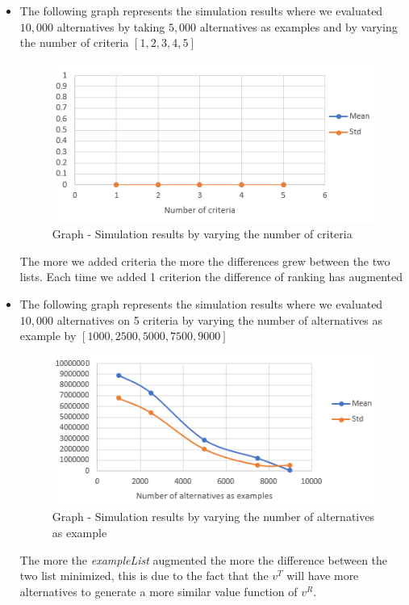 \documentclass{report}
\begin{document}
\begin{itemize}
\item The following graph represents the simulation results where we evaluated $10,000$ alternatives by taking $5,000$ alternatives as examples and by varying the number of criteria $[1, 2, 3, 4, 5]$ 
\begin{figure}[H]
\centering
\includegraphics[keepaspectratio]{graph-02.PNG}
\caption{Graph - Simulation results by varying the number of criteria}
\end{figure}
The more we added criteria the more the differences grew between the two lists. Each time we added 1 criterion the difference of ranking has augmented\\
\newpage
\item The following graph represents the simulation results where we evaluated $10,000$ alternatives on 5 criteria by varying the number of alternatives as example by $[1000, 2500, 5000, 7500, 9000]$ 
\begin{figure}[H]
\centering
\includegraphics[keepaspectratio]{graph-03.PNG}
\caption{Graph - Simulation results by varying the number of alternatives as example}
\end{figure}
The more the \textit{exampleList} augmented the more the difference between the two list minimized, this is due to the fact that the $v^T$ will have more alternatives to generate a more similar value function of $v^R$.
\end{itemize}
\end{document}
